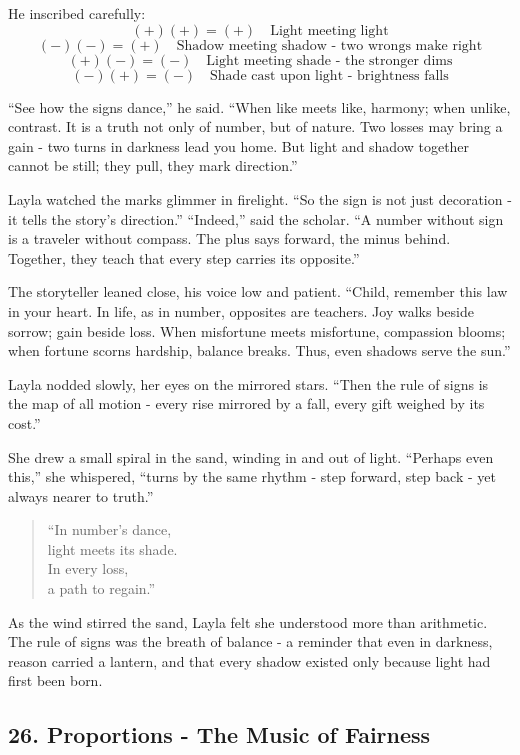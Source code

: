 \documentclass[
  letterpaper,
  DIV=11,
  numbers=noendperiod]{scrreprt}
\begin{document}
He inscribed carefully: \[
(+)(+) = (+) \quad \text{Light meeting light}
\] \[
(-)(-) = (+) \quad \text{Shadow meeting shadow - two wrongs make right}
\] \[
(+)(-) = (-) \quad \text{Light meeting shade - the stronger dims}
\] \[
(-)(+) = (-) \quad \text{Shade cast upon light - brightness falls}
\]

``See how the signs dance,'' he said. ``When like meets like, harmony;
when unlike, contrast. It is a truth not only of number, but of nature.
Two losses may bring a gain - two turns in darkness lead you home. But
light and shadow together cannot be still; they pull, they mark
direction.''

Layla watched the marks glimmer in firelight. ``So the sign is not just
decoration - it tells the story's direction.'' ``Indeed,'' said the
scholar. ``A number without sign is a traveler without compass. The plus
says forward, the minus behind. Together, they teach that every step
carries its opposite.''

The storyteller leaned close, his voice low and patient. ``Child,
remember this law in your heart. In life, as in number, opposites are
teachers. Joy walks beside sorrow; gain beside loss. When misfortune
meets misfortune, compassion blooms; when fortune scorns hardship,
balance breaks. Thus, even shadows serve the sun.''

Layla nodded slowly, her eyes on the mirrored stars. ``Then the rule of
signs is the map of all motion - every rise mirrored by a fall, every
gift weighed by its cost.''

She drew a small spiral in the sand, winding in and out of light.
``Perhaps even this,'' she whispered, ``turns by the same rhythm - step
forward, step back - yet always nearer to truth.''

\begin{quote}
``In number's dance,\\
light meets its shade.\\
In every loss,\\
a path to regain.''
\end{quote}

As the wind stirred the sand, Layla felt she understood more than
arithmetic. The rule of signs was the breath of balance - a reminder
that even in darkness, reason carried a lantern, and that every shadow
existed only because light had first been born.

\subsection{26. Proportions - The Music of
Fairness}\label{proportions---the-music-of-fairness}
\end{document}
